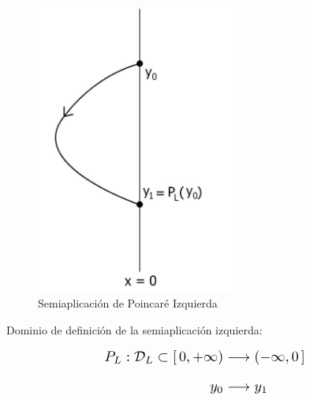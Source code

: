 \documentclass[12pt,a4paper]{report} %
\begin{document}
	
	\begin{figure}[h]
		\centering
		\includegraphics[width=0.6\textwidth]{semiL.jpg}
		\caption{Semiaplicación de Poincaré Izquierda}
		\label{fig:semiL}
	\end{figure}\smallskip
	
	\vspace{0.5cm}Dominio de definición de la semiaplicación izquierda:
	
	\vspace{0.5cm}
	
	\begin{equation}
		\label{eq:dl}
		\scalebox{1.3}{$\displaystyle
		\begin{aligned}
		P_L:\mathcal{D}_L\subset [\,0,+\infty) &\longrightarrow ( -\infty,0\, ]\\[2mm]
		y_0 &\longrightarrow y_1
	\end{aligned}
	$}
	\end{equation}
	
	\newpage
	
\end{document}
